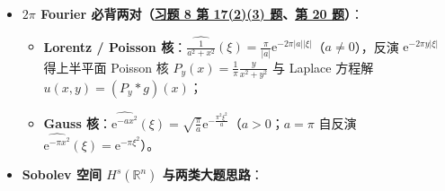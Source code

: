 \documentclass[11pt,a4paper]{article}
\providecommand{\tightlist}{\setlength{\itemsep}{1.8pt}\setlength{\parskip}{0pt}}
\begin{document}
\begin{itemize}
  \begin{itemize}
  \tightlist
  \item
    定义 \(\partial^\alpha\lambda(\varphi)=(-1)^{\lvert\alpha\rvert}\lambda(\partial^\alpha\varphi)\)；\(L^1_{\mathrm{loc}}\) 收敛 \(\Rightarrow\mathcal{D}'\) 收敛，且 \(\mathcal{D}'\) 收敛与任意阶求导无条件交换。
  \item
    \textbf{4 个经典导数（\hyperlink{card:8-11}{\textcolor{LinkColor}{习题 8 第 11 题}}）}：\((\operatorname{sgn}x)'=2\delta\)，\((H(x))'=\delta\)，\((\lvert x\rvert)'=\operatorname{sgn}x\)（有弱导数，而 \(\operatorname{sgn}x\) 无弱导数），\((\ln\lvert x\rvert)'=\operatorname{p.v.}\frac{1}{x}\)（\textbf{例 8.5，p.305}：\(\lim_{\varepsilon\to 0^+}\int_{\lvert x\rvert>\varepsilon}\frac{\varphi(x)}{x}\,\mathrm{d}x\)），\((\ln\lvert x\rvert\operatorname{sgn}x)'=\lambda_1\)（\textbf{例 8.6，p.305}：\(\lambda_1(\varphi)=\int_{\lvert x\rvert<1}\frac{\varphi(x)-\varphi(0)}{\lvert x\rvert}\,\mathrm{d}x+\int_{\lvert x\rvert\ge 1}\frac{\varphi(x)}{\lvert x\rvert}\,\mathrm{d}x\)）。
  \item
    \textbf{3 个必背分布极限（\hyperlink{card:8-9}{\textcolor{LinkColor}{习题 8 第 9 题}}、\hyperlink{card:8-14}{\textcolor{LinkColor}{第 14 题}}）}：\(\lim_{\varepsilon\to 0^+}\frac{\varepsilon}{\varepsilon^2+x^2}=\pi\delta\)（\(\varepsilon\to 0^-\) 为 \(-\pi\delta\)）；\(\lim_{\varepsilon\to 0^+}\frac{1}{\sqrt{\pi\varepsilon}}\mathrm{e}^{-x^2/\varepsilon}=\delta\)；\(\lim_{\varepsilon\to 0}[(x+\mathrm{i}\varepsilon)^{-1}+(x-\mathrm{i}\varepsilon)^{-1}]=\lim_{\varepsilon\to 0}(\ln(x^2+\varepsilon^2))'=2\operatorname{p.v.}\frac{1}{x}\)。
  \end{itemize}
\item
  \textbf{\(2\pi\) Fourier 必背两对（\hyperlink{card:8-17}{\textcolor{LinkColor}{习题 8 第 17(2)(3) 题}}、\hyperlink{card:8-20}{\textcolor{LinkColor}{第 20 题}}）}：

  \begin{itemize}
  \tightlist
  \item
    \textbf{Lorentz / Poisson 核}：\(\widehat{\frac{1}{a^2+x^2}}(\xi)=\frac{\pi}{\lvert a\rvert}\mathrm{e}^{-2\pi\lvert a\rvert\lvert\xi\rvert}\)（\(a\neq 0\)），反演 \(\mathrm{e}^{-2\pi y\lvert\xi\rvert}\) 得上半平面 Poisson 核 \(P_y(x)=\frac{1}{\pi}\frac{y}{x^2+y^2}\) 与 Laplace 方程解 \(u(x,y)=(P_y*g)(x)\)；
  \item
    \textbf{Gauss 核}：\(\widehat{\mathrm{e}^{-ax^2}}(\xi)=\sqrt{\frac{\pi}{a}}\mathrm{e}^{-\frac{\pi^2\xi^2}{a}}\)（\(a>0\)；\(a=\pi\) 自反演 \(\widehat{\mathrm{e}^{-\pi x^2}}(\xi)=\mathrm{e}^{-\pi\xi^2}\)）。
  \end{itemize}
\item
  \textbf{Sobolev 空间 \(H^s(\mathbb{R}^n)\) 与两类大题思路}：


\end{itemize}
\end{document}

